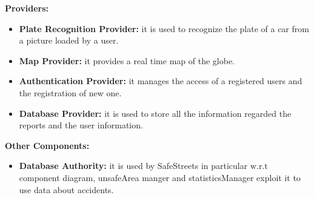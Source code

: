 \documentclass[../RASD.tex]{subfiles}
\begin{document}
    \textbf{Providers:}
    \\
    \begin{itemize}
        \item \textbf{Plate Recognition Provider:} it is used to recognize the plate of a car from a picture loaded by a user.
        \item \textbf{Map Provider:} it provides a real time map of the globe.
        \item \textbf{Authentication Provider:} it manages the access of a registered users and the registration of new one.
        \item \textbf{Database Provider:} it is used to store all the information regarded the reports and the user information.
    \end{itemize}
    \textbf{Other Components:}
    \\
    \begin{itemize}
        \item \textbf{Database Authority:} it is used by SafeStreets in particular w.r.t component diagram, unsafeArea manger and statisticsManager
        exploit it to use data about accidents.
    \end{itemize}
\end{document}
